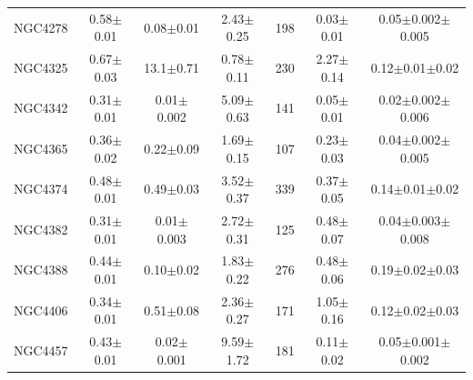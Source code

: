 \documentclass[iop]{emulateapj}
\begin{document}
\begin{table}
\begin{tabular}{lcccccc}
NGC4278 & 0.58$\pm$0.01 & 0.08$\pm$0.01 & 2.43$\pm$0.25 & 198 & 0.03$\pm$0.01  & 0.05$\pm$0.002$\pm$0.005   \\
NGC4325 & 0.67$\pm$0.03 & 13.1$\pm$0.71 & 0.78$\pm$0.11 & 230 & 2.27$\pm$0.14 & 0.12$\pm$0.01$\pm$0.02     \\
NGC4342 & 0.31$\pm$0.01 & 0.01$\pm$0.002 & 5.09$\pm$0.63 & 141 & 0.05$\pm$0.01 & 0.02$\pm$0.002$\pm$0.006 \\
NGC4365 & 0.36$\pm$0.02 & 0.22$\pm$0.09 & 1.69$\pm$0.15 & 107 & 0.23$\pm$0.03 & 0.04$\pm$0.002$\pm$0.005   \\
NGC4374 & 0.48$\pm$0.01 & 0.49$\pm$0.03 & 3.52$\pm$0.37 & 339  & 0.37$\pm$0.05 & 0.14$\pm$0.01$\pm$0.02     \\
NGC4382 & 0.31$\pm$0.01 & 0.01$\pm$0.003  & 2.72$\pm$0.31 & 125 & 0.48$\pm$0.07 & 0.04$\pm$0.003$\pm$0.008    \\
NGC4388 & 0.44$\pm$0.01 & 0.10$\pm$0.02 & 1.83$\pm$0.22 & 276 & 0.48$\pm$0.06 & 0.19$\pm$0.02$\pm$0.03     \\
NGC4406 & 0.34$\pm$0.01 & 0.51$\pm$0.08 & 2.36$\pm$0.27 & 171 & 1.05$\pm$0.16 & 0.12$\pm$0.02$\pm$0.03 \\
NGC4457 & 0.43$\pm$0.01 & 0.02$\pm$0.001  & 9.59$\pm$1.72 & 181 & 0.11$\pm$0.02 & 0.05$\pm$0.001$\pm$0.002    \\
\hline
\end{tabular}
\end{table}
\end{document}

